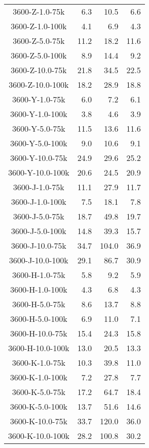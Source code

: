 \begin{longtable}{crrr}
    3600-Z-1.0-75k &   6.3 &   10.5 &   6.6 \\
    3600-Z-1.0-100k &   4.1 &    6.9 &   4.3 \\
    3600-Z-5.0-75k &  11.2 &   18.2 &  11.6 \\
    3600-Z-5.0-100k &   8.9 &   14.4 &   9.2 \\
    3600-Z-10.0-75k &  21.8 &   34.5 &  22.5 \\
    3600-Z-10.0-100k &  18.2 &   28.9 &  18.8 \\
    3600-Y-1.0-75k &   6.0 &    7.2 &   6.1 \\
    3600-Y-1.0-100k &   3.8 &    4.6 &   3.9 \\
    3600-Y-5.0-75k &  11.5 &   13.6 &  11.6 \\
    3600-Y-5.0-100k &   9.0 &   10.6 &   9.1 \\
    3600-Y-10.0-75k &  24.9 &   29.6 &  25.2 \\
    3600-Y-10.0-100k &  20.6 &   24.5 &  20.9 \\
    3600-J-1.0-75k &  11.1 &   27.9 &  11.7 \\
    3600-J-1.0-100k &   7.5 &   18.1 &   7.8 \\
    3600-J-5.0-75k &  18.7 &   49.8 &  19.7 \\
    3600-J-5.0-100k &  14.8 &   39.3 &  15.7 \\
    3600-J-10.0-75k &  34.7 &  104.0 &  36.9 \\
    3600-J-10.0-100k &  29.1 &   86.7 &  30.9 \\
    3600-H-1.0-75k &   5.8 &    9.2 &   5.9 \\
    3600-H-1.0-100k &   4.3 &    6.8 &   4.3 \\
    3600-H-5.0-75k &   8.6 &   13.7 &   8.8 \\
    3600-H-5.0-100k &   6.9 &   11.0 &   7.1 \\
    3600-H-10.0-75k &  15.4 &   24.3 &  15.8 \\
    3600-H-10.0-100k &  13.0 &   20.5 &  13.3 \\
    3600-K-1.0-75k &  10.3 &   39.8 &  11.0 \\
    3600-K-1.0-100k &   7.2 &   27.8 &   7.7 \\
    3600-K-5.0-75k &  17.2 &   64.7 &  18.4 \\
    3600-K-5.0-100k &  13.7 &   51.6 &  14.6 \\
    3600-K-10.0-75k &  33.7 &  120.0 &  36.0 \\
    3600-K-10.0-100k &  28.2 &  100.8 &  30.2 \\

\end{longtable}
